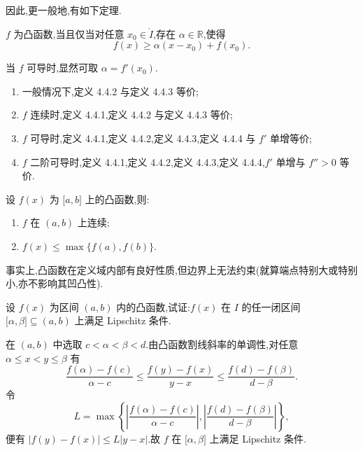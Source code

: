因此,更一般地,有如下定理.

\begin{theorem}[\markstar]
    $f$ 为凸函数,当且仅当对任意 $x_0\in\mathring I$,存在 $\alpha\in\mathbb{R}$,使得
    \[
        f(x)\geq\alpha(x-x_0)+f(x_0).
    \]
\end{theorem}

\begin{remark}
    当 $f$ 可导时,显然可取 $\alpha=f'(x_0)$.
\end{remark}

\begin{theorem}[\markstar]
    \leavevmode
    \begin{enumerate}
        \item 一般情况下,定义 4.4.2 与定义 4.4.3 等价;
        \item $f$ 连续时,定义 4.4.1,定义 4.4.2 与定义 4.4.3 等价;
        \item $f$ 可导时,定义 4.4.1,定义 4.4.2,定义 4.4.3,定义 4.4.4 与 $f'$ 单增等价;
        \item $f$ 二阶可导时,定义 4.4.1,定义 4.4.2,定义 4.4.3,定义 4.4.4,$f'$ 单增与 $f''>0$ 等价.
    \end{enumerate}
\end{theorem}

\begin{theorem}[\markstar]
    设 $f(x)$ 为 $\lbrack a,b\rbrack$ 上的凸函数,则:
    \begin{enumerate}
        \item $f$ 在 $(a,b)$ 上连续;
        \item $f(x)\leq\max\{f(a),f(b)\}$.
    \end{enumerate}
\end{theorem}

\begin{remark}
    事实上,凸函数在定义域内部有良好性质,但边界上无法约束(就算端点特别大或特别小,亦不影响其凹凸性).
\end{remark}

\begin{example}
    设 $f(x)$ 为区间 $(a,b)$ 内的凸函数,试证:$f(x)$ 在 $I$ 的任一闭区间 $\lbrack \alpha,\beta\rbrack\subseteq(a,b)$ 上满足 Lipschitz 条件.
\end{example}
\exampleblank

\begin{solution}
    在 $(a,b)$ 中选取 $c<\alpha<\beta<d$.由凸函数割线斜率的单调性,对任意 $\alpha\leq x<y\leq\beta$ 有
    \[
        \dfrac{f(\alpha)-f(c)}{\alpha-c}
        \leq\dfrac{f(y)-f(x)}{y-x}
        \leq\dfrac{f(d)-f(\beta)}{d-\beta}.
    \]
    令
    \[
        L=\max\left\{
        \left|\dfrac{f(\alpha)-f(c)}{\alpha-c}\right|,
        \left|\dfrac{f(d)-f(\beta)}{d-\beta}\right|
        \right\},
    \]
    便有 $|f(y)-f(x)|\leq L|y-x|$.故 $f$ 在 $\lbrack\alpha,\beta\rbrack$ 上满足 Lipschitz 条件.
\end{solution}

